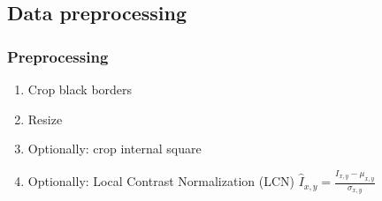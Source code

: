 \documentclass{beamer}
\begin{document}
\subsection{Data preprocessing}
\begin{frame}\frametitle{Preprocessing}

\begin{enumerate}
\item Crop black borders
\item Resize
\item Optionally: crop internal square
\item Optionally: Local Contrast Normalization (LCN) $ \hat{I}_{x,y} = \frac{I_{x,y} - \mu_{x,y}}{\sigma_{x,y}} $
\end{enumerate}

\end{frame}
\end{document}
